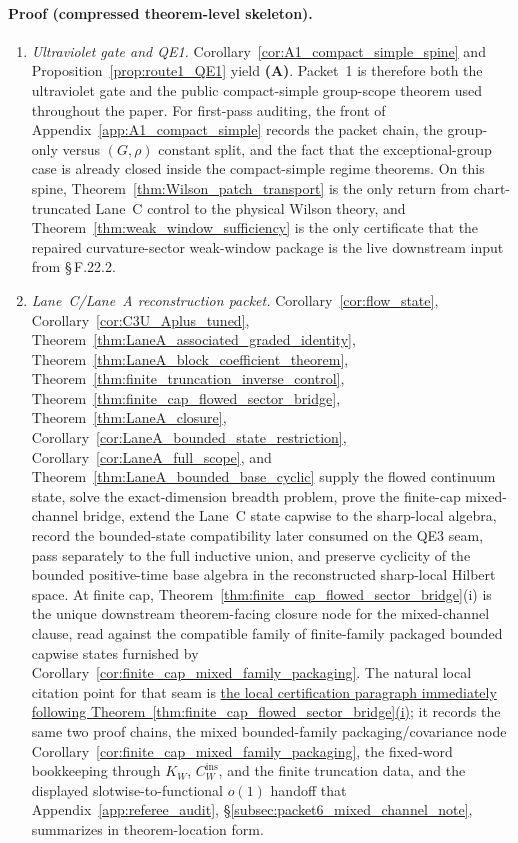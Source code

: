 \begin{theorem}
\paragraph{Proof (compressed theorem-level skeleton).}
\begin{enumerate}[label=\textbf{Step \arabic*:},leftmargin=2.6em]
\item \emph{Ultraviolet gate and QE1.}
Corollary~\ref{cor:A1_compact_simple_spine} and Proposition~\ref{prop:route1_QE1} yield \textbf{(A)}.
Packet~1 is therefore both the ultraviolet gate and the public compact-simple group-scope theorem used throughout the paper.
For first-pass auditing, the front of Appendix~\ref{app:A1_compact_simple} records the packet chain, the group-only versus $(G,\rho)$ constant split, and the fact that the exceptional-group case is already closed inside the compact-simple regime theorems.
On this spine, Theorem~\ref{thm:Wilson_patch_transport} is the only return from chart-truncated Lane~C control to the physical Wilson theory, and Theorem~\ref{thm:weak_window_sufficiency} is the only certificate that the repaired curvature-sector weak-window package is the live downstream input from \S\,F.22.2.
\item \emph{Lane~C/Lane~A reconstruction packet.}
Corollary~\ref{cor:flow_state}, Corollary~\ref{cor:C3U_Aplus_tuned}, Theorem~\ref{thm:LaneA_associated_graded_identity}, Theorem~\ref{thm:LaneA_block_coefficient_theorem}, Theorem~\ref{thm:finite_truncation_inverse_control}, Theorem~\ref{thm:finite_cap_flowed_sector_bridge}, Theorem~\ref{thm:LaneA_closure}, Corollary~\ref{cor:LaneA_bounded_state_restriction}, Corollary~\ref{cor:LaneA_full_scope}, and Theorem~\ref{thm:LaneA_bounded_base_cyclic} supply the flowed continuum state, solve the exact-dimension breadth problem, prove the finite-cap mixed-channel bridge, extend the Lane~C state capwise to the sharp-local algebra, record the bounded-state compatibility later consumed on the QE3 seam, pass separately to the full inductive union, and preserve cyclicity of the bounded positive-time base algebra in the reconstructed sharp-local Hilbert space.
At finite cap, Theorem~\ref{thm:finite_cap_flowed_sector_bridge}(i) is the unique downstream theorem-facing closure node for the mixed-channel clause, read against the compatible family of finite-family packaged bounded capwise states furnished by Corollary~\ref{cor:finite_cap_mixed_family_packaging}.
The natural local citation point for that seam is \hyperref[par:finite_cap_mixed_channel_certification]{the local certification paragraph immediately following Theorem~\ref{thm:finite_cap_flowed_sector_bridge}(i)}; it records the same two proof chains, the mixed bounded-family packaging/covariance node Corollary~\ref{cor:finite_cap_mixed_family_packaging}, the fixed-word bookkeeping through $K_W$, $C_W^{\mathrm{ins}}$, and the finite truncation data, and the displayed slotwise-to-functional $o(1)$ handoff that Appendix~\ref{app:referee_audit}, \S\ref{subsec:packet6_mixed_channel_note}, summarizes in theorem-location form.

\end{enumerate}
\end{theorem}
